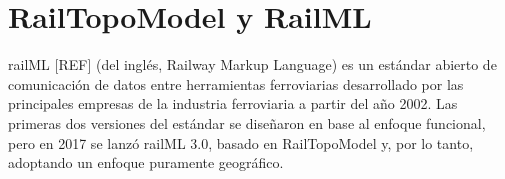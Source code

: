 \section{RailTopoModel y RailML}
    \label{sec:railML}
    
    
    
    railML [REF] (del inglés, Railway Markup Language) es un estándar abierto de comunicación de datos entre herramientas ferroviarias desarrollado por las principales empresas de la industria ferroviaria a partir del año 2002. Las primeras dos versiones del estándar se diseñaron en base al enfoque funcional, pero en 2017 se lanzó railML 3.0, basado en RailTopoModel y, por lo tanto, adoptando un enfoque puramente geográfico.

	
	